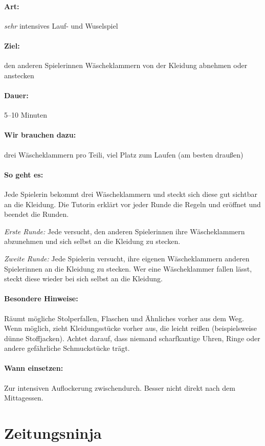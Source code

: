 \paragraph{Art:} \emph{sehr} intensives Lauf- und Wuselspiel
\paragraph{Ziel:} den anderen Spielerinnen Wäscheklammern von der Kleidung abnehmen oder anstecken
\paragraph{Dauer:} 5--10 Minuten
\paragraph{Wir brauchen dazu:} drei Wäscheklammern pro Teili, viel Platz zum Laufen (am besten draußen)
\paragraph{So geht es:} Jede Spielerin bekommt drei Wäscheklammern und steckt sich diese gut sichtbar an die Kleidung. Die Tutorin erklärt vor jeder Runde die Regeln und eröffnet und beendet die Runden.

\emph{Erste Runde:} Jede versucht, den anderen Spielerinnen ihre Wäscheklammern abzunehmen und sich selbst an die Kleidung zu stecken.

\emph{Zweite Runde:} Jede Spielerin versucht, ihre eigenen Wäscheklammern anderen Spielerinnen an die Kleidung zu stecken. Wer eine Wäscheklammer fallen lässt, steckt diese wieder bei sich selbst an die Kleidung.

\paragraph{Besondere Hinweise:} Räumt mögliche Stolperfallen, Flaschen und Ähnliches vorher aus dem Weg. Wenn möglich, zieht Kleidungsstücke vorher aus, die leicht reißen (beispielsweise dünne Stoffjacken). Achtet darauf, dass niemand scharfkantige Uhren, Ringe oder andere gefährliche Schmuckstücke trägt.
\paragraph{Wann einsetzen:} Zur intensiven Auflockerung zwischendurch. Besser nicht direkt nach dem Mittagessen.

\section{Zeitungsninja}
